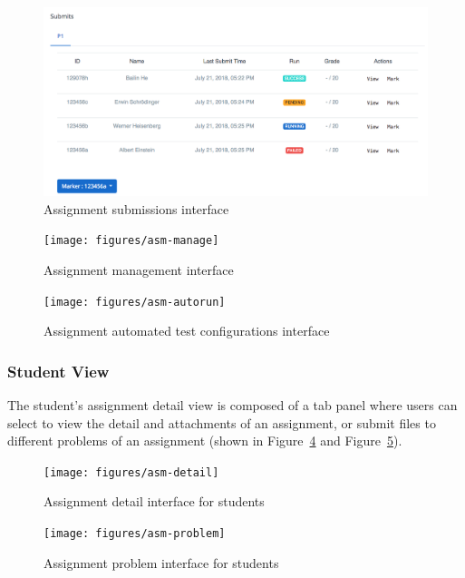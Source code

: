 \begin{figure}[H]
    \centering
        \includegraphics[width=1.0\textwidth]{figures/asm-submits}
    \caption{Assignment submissions interface}
    \label{fig:ASM_SUBMITS}
\end{figure}

\begin{figure}[H]
    \centering
        \texttt{[image: figures/asm-manage]}
    \caption{Assignment management interface}
    \label{fig:ASM_MANAGE}
\end{figure}

\begin{figure}[H]
    \centering
        \texttt{[image: figures/asm-autorun]}
    \caption{Assignment automated test configurations interface}
    \label{fig:ASM_AUTORUN}
\end{figure}

\subsubsection{Student View}
The student's assignment detail view is composed of a tab panel where users can
select to view the detail and attachments of an assignment, or submit files
to different problems of an assignment (shown in Figure~\ref{fig:ASM_DETAIL}
and Figure~\ref{fig:ASM_PROBLEM}).

\begin{figure}[H]
    \centering
        \texttt{[image: figures/asm-detail]}
    \caption{Assignment detail interface for students}
    \label{fig:ASM_DETAIL}
\end{figure}

\begin{figure}[H]
    \centering
        \texttt{[image: figures/asm-problem]}
    \caption{Assignment problem interface for students}
    \label{fig:ASM_PROBLEM}
\end{figure}


